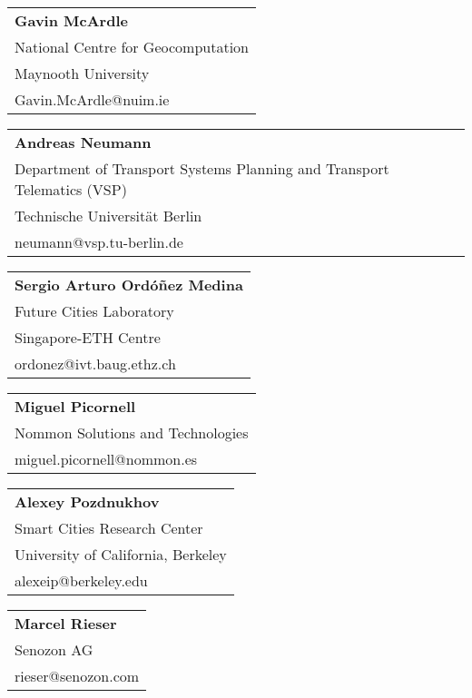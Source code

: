 \begin{tabular}[width=0.48\textwidth]{l}
\textbf{Gavin McArdle} \\
National Centre for Geocomputation \\
Maynooth University \\
Gavin.McArdle@nuim.ie \\
\end{tabular}

\begin{tabular}[width=0.48\textwidth]{l}
\textbf{Andreas Neumann} \\
Department of Transport Systems Planning and Transport Telematics (VSP) \\
Technische Universität Berlin \\
neumann@vsp.tu-berlin.de \\
\end{tabular}

\begin{tabular}[width=0.48\textwidth]{l}
\textbf{Sergio Arturo Ordóñez Medina} \\
Future Cities Laboratory \\
Singapore-ETH Centre\\
ordonez@ivt.baug.ethz.ch \\
\end{tabular}

\begin{tabular}[width=0.48\textwidth]{l}
\textbf{Miguel Picornell} \\
Nommon Solutions and Technologies \\
miguel.picornell@nommon.es \\
\end{tabular}

\begin{tabular}[width=0.48\textwidth]{l}
\textbf{Alexey Pozdnukhov} \\
Smart Cities Research Center \\
University of California, Berkeley \\
alexeip@berkeley.edu \\
\end{tabular}

\begin{tabular}[width=0.48\textwidth]{l}
\textbf{Marcel Rieser} \\
Senozon AG \\
rieser@senozon.com \\
\end{tabular}

